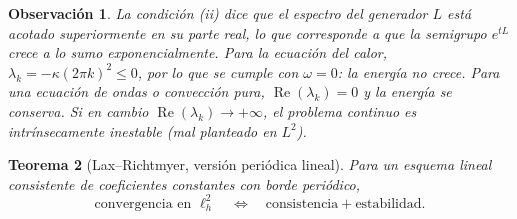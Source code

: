 \documentclass[a4paper,11pt]{report}
\newtheorem{theorem}{Teorema}[chapter]
\newtheorem{remark}[theorem]{Observación}
\begin{document}
\begin{remark}
La condición (ii) dice que el espectro del generador $L$ está acotado superiormente en su parte real, lo que corresponde a que la semigrupo $e^{tL}$ crece a lo sumo exponencialmente.  Para la ecuación del calor, $\lambda_k=-\kappa(2\pi k)^2\le 0$, por lo que se cumple con $\omega=0$: la energía no crece.  Para una ecuación de ondas o convección pura, $\operatorname{Re}(\lambda_k)=0$ y la energía se conserva. Si en cambio $\operatorname{Re}(\lambda_k)\to+\infty$, el problema continuo es intrínsecamente inestable (mal planteado en $L^2$).
\end{remark}

\begin{theorem}[Lax--Richtmyer, versión periódica lineal]\label{thm:lax_periodico_new}
Para un esquema lineal consistente de coeficientes constantes con borde periódico,
\[
\text{convergencia en }\ell^2_h
\quad\Longleftrightarrow\quad
\text{consistencia}+\text{estabilidad}.
\]
\end{theorem}
\end{document}
